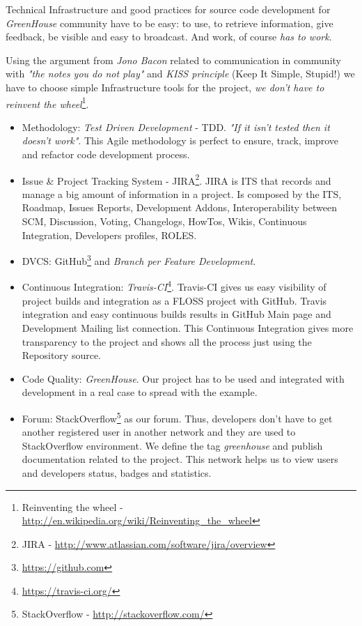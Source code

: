 \documentclass[11pt]{scrartcl}
\begin{document}
\par Technical Infrastructure and good practices for source code development for \emph{GreenHouse} community have to be easy: to use, to retrieve information, give feedback, be visible and easy to broadcast. And work, of course \emph{has to work}.

\par Using the argument from \emph{Jono Bacon} related to communication in community with \emph{"the notes you do not play"} and \emph{KISS principle} (Keep It Simple, Stupid!\cite{kiss}) we have to choose simple Infrastructure tools for the project, \emph{we don't have to reinvent the wheel}\footnote{Reinventing the wheel - \url{http://en.wikipedia.org/wiki/Reinventing_the_wheel}}.

\begin{itemize}
	\item Methodology: \emph{Test Driven Development} - TDD. \emph{"If it isn’t tested then it doesn’t work"}. This Agile methodology is perfect to ensure, track, improve and refactor code development process. %
	\item Issue \& Project Tracking System - JIRA\footnote{JIRA - \url{http://www.atlassian.com/software/jira/overview}}. JIRA is ITS that records and manage a big amount of information in a project. Is composed by the ITS, Roadmap, Issues Reports, Development Addons, Interoperability between SCM, Discussion, Voting, Changelogs, HowTos, Wikis, Continuous Integration, Developers profiles, ROLES. %
	\item DVCS: GitHub\footnote{\url{https://github.com}} and \emph{Branch per Feature Development}\cite{branch-per-feature}. %
	\item Continuous Integration: \emph{Travis-CI}\footnote{\url{https://travis-ci.org/}}. Travis-CI gives us easy visibility of project builds and integration as a FLOSS project with GitHub. Travis integration and easy continuous builds results in GitHub Main page and Development Mailing list connection. This Continuous Integration gives more transparency to the project and shows all the process just using the Repository source. %
	\item Code Quality: \emph{GreenHouse}. Our project has to be used and integrated with development in a real case to spread with the example.
	\item Forum: StackOverflow\footnote{StackOverflow - \url{http://stackoverflow.com/}} as our forum. Thus, developers don't have to get another registered user in another network and they are used to StackOverflow environment. We define the tag \emph{greenhouse} and publish documentation related to the project. This network helps us to view users and developers status, badges and statistics.

\end{itemize}
\end{document}
